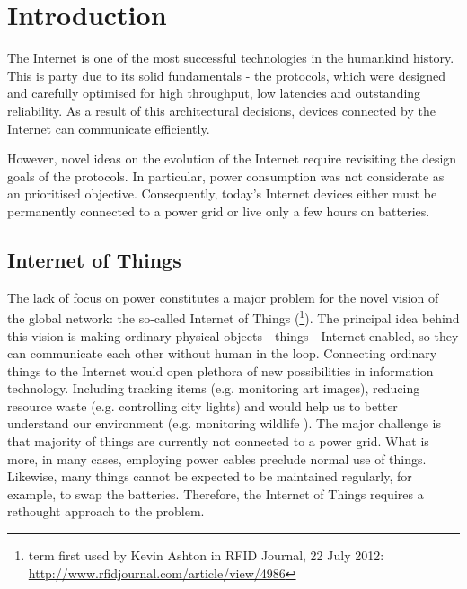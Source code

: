 \chapter{Introduction}

The Internet is one of the most successful technologies in the humankind history. This is party due to its solid fundamentals - the protocols, which were designed and carefully optimised for high throughput, low latencies and outstanding reliability. As a result of this architectural decisions, devices connected by the Internet can communicate efficiently.

However, novel ideas on the evolution of the Internet require revisiting the design goals of the protocols. In particular, power consumption was not considerate as an prioritised objective. Consequently, today's Internet devices either must be permanently connected to a power grid or live only a few hours on batteries.

\section{Internet of Things}

The lack of focus on power constitutes a major problem for the novel vision of the global network: the so-called Internet of Things (\footnote{term first used by Kevin Ashton in RFID Journal, 22 July 2012: \url{http://www.rfidjournal.com/article/view/4986}}). The principal idea behind this vision is making ordinary physical objects - things - Internet-enabled, so they can communicate each other without human in the loop. Connecting ordinary things to the Internet would open plethora of new possibilities in information technology. Including tracking items (e.g. monitoring art images), reducing resource waste (e.g. controlling city lights) and would help us to better understand our environment (e.g. monitoring wildlife \cite{liu2009long}).
The major challenge is that majority of things are currently not connected to a power grid. What is more, in many cases, employing power cables preclude normal use of things. Likewise, many things cannot be expected to be maintained regularly, for example, to swap the batteries.
Therefore, the Internet of Things requires a rethought approach to the problem.


